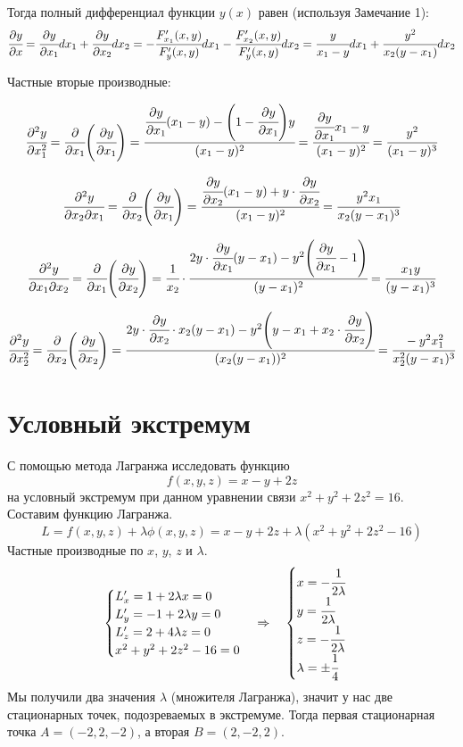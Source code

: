 \documentclass[12pt]{report}
\begin{document}
Тогда полный дифференциал функции $y(x)$ равен (используя Замечание 1):
$$ \cfrac{\partial y}{\partial x}=\cfrac{\partial y}{\partial x_1}dx_1+\cfrac{\partial y}{\partial x_2}dx_2= -\cfrac{F_{x_1}'(x,y)}{F_y'(x,y)}dx_1 - \cfrac{F_{x_2}'(x,y)}{F_y'(x,y)}dx_2 =\cfrac{y}{x_1-y}dx_1+\cfrac{y^2}{x_2(y-x_1)}dx_2 $$

Частные вторые производные:

$$ \cfrac{\partial^2y}{\partial x_1^2}=\cfrac{\partial}{\partial x_1}\Bigg(\cfrac{\partial y}{\partial x_1}\Bigg)= \cfrac{\cfrac{\partial y}{\partial x_1}(x_1-y)-\Bigg(1-\cfrac{\partial y}{\partial x_1}\Bigg)y}{(x_1-y)^2}=\cfrac{\cfrac{\partial y}{\partial x_1}x_1-y}{(x_1-y)^2}=\cfrac{y^2}{(x_1-y)^3}$$

$$\cfrac{\partial^2y}{\partial x_2\partial x_1}=\cfrac{\partial}{\partial x_2}\Bigg(\cfrac{\partial y}{\partial x_1}\Bigg)=\cfrac{\cfrac{\partial y}{\partial x_2}(x_1-y)+y\cdot\cfrac{\partial y}{\partial x_2}}{(x_1-y)^2}= \cfrac{y^2x_1}{x_2(y-x_1)^3}$$

$$\cfrac{\partial^2y}{\partial x_1\partial x_2}=\cfrac{\partial}{\partial x_1}\Bigg(\cfrac{\partial y}{\partial x_2}\Bigg)= \cfrac{1}{x_2}\cdot\cfrac{2y\cdot\cfrac{\partial y}{\partial x_1}(y-x_1)-y^2\Bigg(\cfrac{\partial y}{\partial x_1}-1\Bigg)}{(y-x_1)^2}=\cfrac{x_1y}{(y-x_1)^3} $$

$$\cfrac{\partial^2y}{\partial x_2^2}=\cfrac{\partial}{\partial x_2}\Bigg(\cfrac{\partial y}{\partial x_2}\Bigg)= \cfrac{2y\cdot\cfrac{\partial y}{\partial x_2}\cdot x_2(y-x_1)-y^2\Bigg(y-x_1+x_2\cdot\cfrac{\partial y}{\partial x_2}\Bigg)}{(x_2(y-x_1))^2}=\cfrac{-y^2x_1^2}{x_2^2(y-x_1)^3} $$

\chapter{Условный экстремум}
С помощью метода Лагранжа исследовать функцию 
$$ f(x,y,z)=x-y+2z $$
на условный экстремум при данном уравнении связи $x^2+y^2+2z^2=16$.
Составим функцию Лагранжа.
$$ L=f(x,y,z)+\lambda \phi(x,y,z)=x-y+2z+\lambda(x^2+y^2+2z^2-16) $$
Частные производные по $x$, $y$, $z$ и $\lambda$.
$$\begin{cases} L_x'=1+2\lambda x=0 \\ L_y'=-1+2\lambda y=0 \\ L_z'=2+4\lambda z=0 \\ x^2+y^2+2z^2-16=0\end{cases} \Rightarrow\quad \begin{cases} x=-\cfrac{1}{2\lambda} \\ y=\cfrac{1}{2\lambda} \\ z=-\cfrac{1}{2\lambda} \\ \lambda=\pm \cfrac{1}{4} \end{cases}$$
Мы получили два значения $\lambda$ (множителя Лагранжа), значит у нас две стационарных точек, подозреваемых в экстремуме. Тогда первая стационарная точка $A=(-2,2,-2)$, а вторая $B=(2,-2,2)$.
\end{document}

